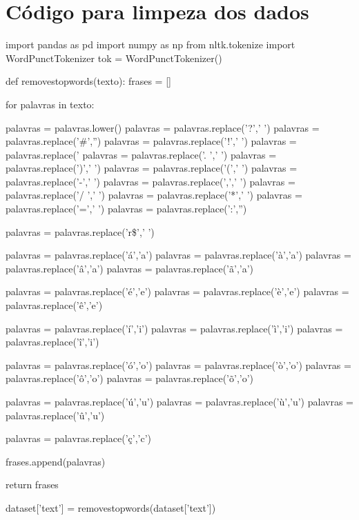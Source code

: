 \UseRawInputEncoding

\section{Código para limpeza dos dados}
\label{cod:limpeza}

\begin{python}
import pandas as pd  
import numpy as np
from nltk.tokenize import WordPunctTokenizer
tok = WordPunctTokenizer()

def removestopwords(texto):
    frases = []
   
    for palavras in texto:
        
        palavras = palavras.lower()
        palavras = palavras.replace('?',' ')
        palavras = palavras.replace('#','')
        palavras = palavras.replace('!',' ')
        palavras = palavras.replace('%
        palavras = palavras.replace('. ',' ')
        palavras = palavras.replace(')',' ')
        palavras = palavras.replace('(',' ')
        palavras = palavras.replace('-',' ')
        palavras = palavras.replace(',',' ')
        palavras = palavras.replace('/ ',' ')
        palavras = palavras.replace('*',' ')
        palavras = palavras.replace('=',' ')
        palavras = palavras.replace(':','')
        
        palavras = palavras.replace('r\$',' ')
               
        palavras = palavras.replace('á','a')
        palavras = palavras.replace('à','a')
        palavras = palavras.replace('â','a')
        palavras = palavras.replace('ã','a')
        
        palavras = palavras.replace('é','e')
        palavras = palavras.replace('è','e')
        palavras = palavras.replace('ê','e')
        
        
        palavras = palavras.replace('í','i')
        palavras = palavras.replace('ì','i')
        palavras = palavras.replace('î','i')
                       
        palavras = palavras.replace('ó','o')
        palavras = palavras.replace('ò','o')
        palavras = palavras.replace('ô','o')
        palavras = palavras.replace('õ','o')
        
        palavras = palavras.replace('ú','u')
        palavras = palavras.replace('ù','u')
        palavras = palavras.replace('û','u')
               
        palavras = palavras.replace('ç','c')
              
        frases.append(palavras)
                                    
        
    return frases
    
dataset['text'] = removestopwords(dataset['text'])
\end{python}


